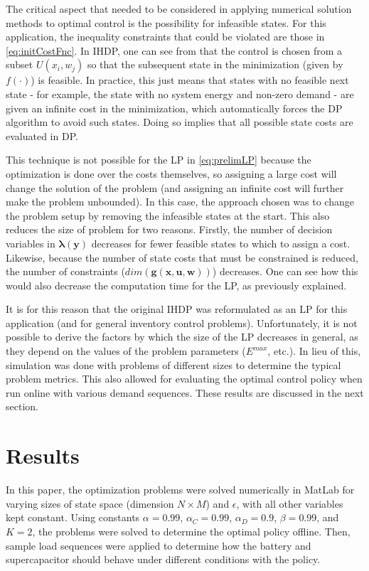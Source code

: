 \documentclass[conference]{IEEEtran}
\begin{document}
The critical aspect that needed to be considered in applying numerical solution methods to optimal control is the possibility for infeasible states. For this application, the inequality constraints that could be violated are those in \eqref{eq:initCostFnc}. In IHDP, one can see from \label{eq:IHDP} that the control is chosen from a subset $U(x_{i},w_{j})$ so that the subsequent state in the minimization (given by $f(\cdot)$) is feasible. In practice, this just means that states with no feasible next state - for example, the state with no system energy and non-zero demand - are given an infinite cost in the minimization, which automatically forces the DP algorithm to avoid such states. Doing so implies that all possible state costs are evaluated in DP.

This technique is not possible for the LP in \eqref{eq:prelimLP} because the optimization is done over the costs themselves, so assigning a large cost will change the solution of the problem (and assigning an infinite cost will further make the problem unbounded). In this case, the approach chosen was to change the problem setup by removing the infeasible states at the start. This also reduces the size of problem for two reasons. Firstly, the number of decision variables in $\boldsymbol{\lambda(y)}$ decreases for fewer feasible states to which to assign a cost. Likewise, because the number of state costs that must be constrained is reduced, the number of constraints ($dim(\boldsymbol{g(x,u,w)})$) decreases. One can see how this would also decrease the computation time for the LP, as previously explained.

It is for this reason that the original IHDP was reformulated as an LP for this application (and for general inventory control problems). Unfortunately, it is not possible to derive the factors by which the size of the LP decreases in general, as they depend on the values of the problem parameters ($E^{max}$, etc.). In lieu of this, simulation was done with problems of different sizes to determine the typical problem metrics. This also allowed for evaluating the optimal control policy when run online with various demand sequences. These results are discussed in the next section.


\section{Results}
In this paper, the optimization problems were solved numerically in MatLab for varying sizes of state space (dimension $N \times M$) and $\epsilon$, with all other variables kept constant. Using constants $\alpha=0.99$, $\alpha_{C}=0.99$, $\alpha_{D}=0.9$, $\beta=0.99$, and $K=2$, the problems were solved to determine the optimal policy offline. Then, sample load sequences were applied to determine how the battery and supercapacitor should behave under different conditions with the policy. %
\end{document}
